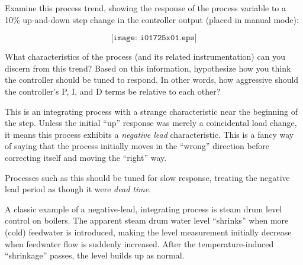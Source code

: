 

Examine this process trend, showing the response of the process variable to a 10\% up-and-down step change in the controller output (placed in manual mode):

$$\texttt{[image: i01725x01.eps]}$$

What characteristics of the process (and its related instrumentation) can you discern from this trend?  Based on this information, hypothesize how you think the controller should be tuned to respond.  In other words, how aggressive should the controller's P, I, and D terms be relative to each other?







This is an integrating process with a strange characteristic near the beginning of the step.  Unless the initial ``up'' response was merely a coincidental load change, it means this process exhibits a {\it negative lead} characteristic.  This is a fancy way of saying that the process initially moves in the ``wrong'' direction before correcting itself and moving the ``right'' way.

Processes such as this should be tuned for slow response, treating the negative lead period as though it were {\it dead time}.







A classic example of a negative-lead, integrating process is steam drum level control on boilers.  The apparent steam drum water level ``shrinks'' when more (cold) feedwater is introduced, making the level measurement initially decrease when feedwater flow is suddenly increased.  After the temperature-induced ``shrinkage'' passes, the level builds up as normal.




